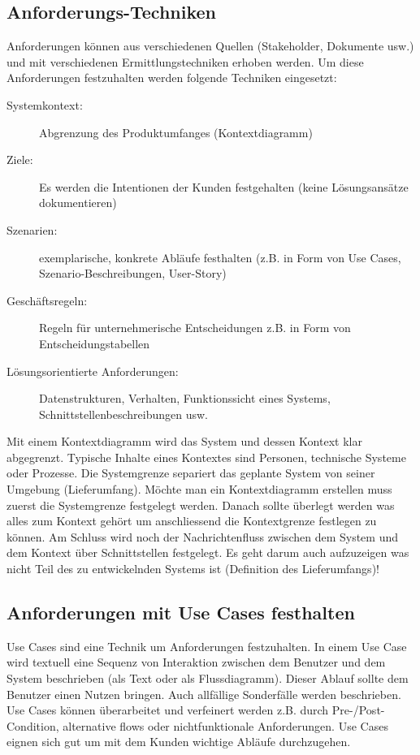 \subsection{Anforderungs-Techniken}

Anforderungen können aus verschiedenen Quellen (Stakeholder, Dokumente usw.) und mit verschiedenen Ermittlungstechniken erhoben werden. Um diese Anforderungen festzuhalten werden folgende Techniken eingesetzt:
\begin{description}
	\item[Systemkontext:] Abgrenzung des Produktumfanges (Kontextdiagramm)
	\item[Ziele:] Es werden die Intentionen der Kunden festgehalten (keine Lösungsansätze dokumentieren)
	\item[Szenarien:] exemplarische, konkrete Abläufe festhalten (z.B. in Form von Use Cases, Szenario-Beschreibungen, User-Story)
	\item[Geschäftsregeln:] Regeln für unternehmerische Entscheidungen z.B. in Form von Entscheidungstabellen
	\item[Lösungsorientierte Anforderungen:] Datenstrukturen, Verhalten, Funktionssicht eines Systems, Schnittstellenbeschreibungen usw.
\end{description}
Mit einem Kontextdiagramm wird das System und dessen Kontext klar abgegrenzt. Typische Inhalte eines Kontextes sind Personen, technische Systeme oder Prozesse. Die Systemgrenze separiert das geplante System von seiner Umgebung (Lieferumfang). Möchte man ein Kontextdiagramm erstellen muss zuerst die Systemgrenze festgelegt werden. Danach sollte überlegt werden was alles zum Kontext gehört um anschliessend die Kontextgrenze festlegen zu können. Am Schluss wird noch der Nachrichtenfluss zwischen dem System und dem Kontext über Schnittstellen festgelegt. Es geht darum auch aufzuzeigen was nicht Teil des zu entwickelnden Systems ist (Definition des Lieferumfangs)!

\subsection{Anforderungen mit Use Cases festhalten}

Use Cases sind eine Technik um Anforderungen festzuhalten. In einem Use Case wird textuell eine Sequenz von Interaktion zwischen dem Benutzer und dem System beschrieben (als Text oder als Flussdiagramm). Dieser Ablauf sollte dem Benutzer einen Nutzen bringen. Auch allfällige Sonderfälle werden beschrieben. Use Cases können überarbeitet und verfeinert werden z.B. durch Pre-/Post-Condition, alternative flows oder nichtfunktionale Anforderungen. Use Cases eignen sich gut um mit dem Kunden wichtige Abläufe durchzugehen.

